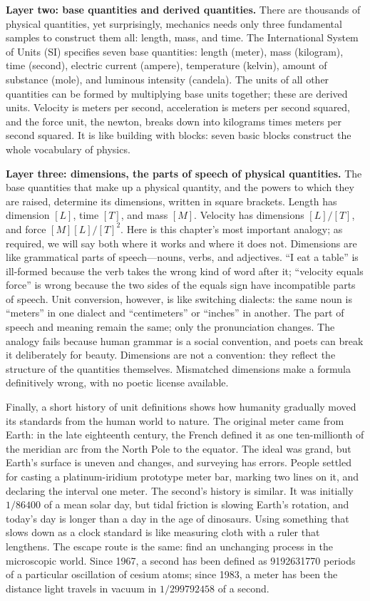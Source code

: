 \textbf{Layer two: base quantities and derived quantities.} There are thousands of physical quantities, yet surprisingly, mechanics needs only three fundamental samples to construct them all: length, mass, and time. The International System of Units (SI) specifies seven base quantities: length (meter), mass (kilogram), time (second), electric current (ampere), temperature (kelvin), amount of substance (mole), and luminous intensity (candela). The units of all other quantities can be formed by multiplying base units together; these are derived units. Velocity is meters per second, acceleration is meters per second squared, and the force unit, the newton, breaks down into kilograms times meters per second squared. It is like building with blocks: seven basic blocks construct the whole vocabulary of physics.

\textbf{Layer three: dimensions, the parts of speech of physical quantities.} The base quantities that make up a physical quantity, and the powers to which they are raised, determine its dimensions, written in square brackets. Length has dimension $[L]$, time $[T]$, and mass $[M]$. Velocity has dimensions $[L]/[T]$, and force $[M][L]/[T]^2$. Here is this chapter's most important analogy; as required, we will say both where it works and where it does not. Dimensions are like grammatical parts of speech---nouns, verbs, and adjectives. ``I eat a table'' is ill-formed because the verb takes the wrong kind of word after it; ``velocity equals force'' is wrong because the two sides of the equals sign have incompatible parts of speech. Unit conversion, however, is like switching dialects: the same noun is ``meters'' in one dialect and ``centimeters'' or ``inches'' in another. The part of speech and meaning remain the same; only the pronunciation changes. The analogy fails because human grammar is a social convention, and poets can break it deliberately for beauty. Dimensions are not a convention: they reflect the structure of the quantities themselves. Mismatched dimensions make a formula definitively wrong, with no poetic license available.

Finally, a short history of unit definitions shows how humanity gradually moved its standards from the human world to nature. The original meter came from Earth: in the late eighteenth century, the French defined it as one ten-millionth of the meridian arc from the North Pole to the equator. The ideal was grand, but Earth's surface is uneven and changes, and surveying has errors. People settled for casting a platinum-iridium prototype meter bar, marking two lines on it, and declaring the interval one meter. The second's history is similar. It was initially $1/86400$ of a mean solar day, but tidal friction is slowing Earth's rotation, and today's day is longer than a day in the age of dinosaurs. Using something that slows down as a clock standard is like measuring cloth with a ruler that lengthens. The escape route is the same: find an unchanging process in the microscopic world. Since 1967, a second has been defined as 9192631770 periods of a particular oscillation of cesium atoms; since 1983, a meter has been the distance light travels in vacuum in $1/299792458$ of a second.

